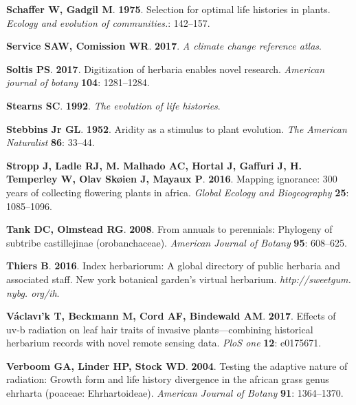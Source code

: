\documentclass[man,floatsintext]{apa6}
\theoremstyle{definition}
\theoremstyle{definition}
\theoremstyle{definition}
\theoremstyle{remark}
\begin{document}
\leavevmode\hypertarget{ref-schaffer1975selection}{}%
\textbf{\textnormal{Schaffer W}, \textnormal{Gadgil M}}. \textbf{1975}.
Selection for optimal life histories in plants. \emph{Ecology and
evolution of communities.}: 142--157.

\leavevmode\hypertarget{ref-south2017a}{}%
\textbf{\textnormal{Service SAW}, \textnormal{Comission WR}}.
\textbf{2017}. \emph{A climate change reference atlas}.

\leavevmode\hypertarget{ref-soltis2017digitization}{}%
\textbf{\textnormal{Soltis PS}}. \textbf{2017}. Digitization of herbaria
enables novel research. \emph{American journal of botany} \textbf{104}:
1281--1284.

\leavevmode\hypertarget{ref-stearns1992evolution}{}%
\textbf{\textnormal{Stearns SC}}. \textbf{1992}. \emph{The evolution of
life histories}.

\leavevmode\hypertarget{ref-stebbins1952aridity}{}%
\textbf{\textnormal{Stebbins Jr GL}}. \textbf{1952}. Aridity as a
stimulus to plant evolution. \emph{The American Naturalist} \textbf{86}:
33--44.

\leavevmode\hypertarget{ref-stropp2016mapping}{}%
\textbf{\textnormal{Stropp J}, \textnormal{Ladle RJ}, \textnormal{M.
Malhado AC}, \textnormal{Hortal J}, \textnormal{Gaffuri J},
\textnormal{H. Temperley W}, \textnormal{Olav Skøien J},
\textnormal{Mayaux P}}. \textbf{2016}. Mapping ignorance: 300 years of
collecting flowering plants in africa. \emph{Global Ecology and
Biogeography} \textbf{25}: 1085--1096.

\leavevmode\hypertarget{ref-tank2008annuals}{}%
\textbf{\textnormal{Tank DC}, \textnormal{Olmstead RG}}. \textbf{2008}.
From annuals to perennials: Phylogeny of subtribe castillejinae
(orobanchaceae). \emph{American Journal of Botany} \textbf{95}:
608--625.

\leavevmode\hypertarget{ref-thiers2016index}{}%
\textbf{\textnormal{Thiers B}}. \textbf{2016}. Index herbariorum: A
global directory of public herbaria and associated staff. New york
botanical garden's virtual herbarium. \emph{http://sweetgum. nybg.
org/ih}.

\leavevmode\hypertarget{ref-vaclavik2017effects}{}%
\textbf{\textnormal{Václavı'k T}, \textnormal{Beckmann M},
\textnormal{Cord AF}, \textnormal{Bindewald AM}}. \textbf{2017}. Effects
of uv-b radiation on leaf hair traits of invasive plants---combining
historical herbarium records with novel remote sensing data. \emph{PloS
one} \textbf{12}: e0175671.

\leavevmode\hypertarget{ref-verboom2004testing}{}%
\textbf{\textnormal{Verboom GA}, \textnormal{Linder HP},
\textnormal{Stock WD}}. \textbf{2004}. Testing the adaptive nature of
radiation: Growth form and life history divergence in the african grass
genus ehrharta (poaceae: Ehrhartoideae). \emph{American Journal of
Botany} \textbf{91}: 1364--1370.
\end{document}
